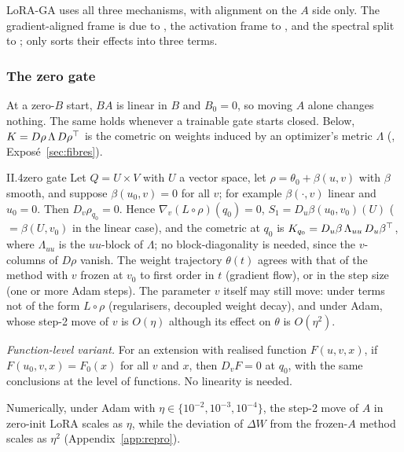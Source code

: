 \medskip
LoRA-GA uses all three mechanisms, with alignment on the $A$ side only. The gradient-aligned frame is due to
\citet{wang2024lorab}, the activation frame to \citet{paischer2024parameter}, and the spectral split to
\citet{meng2024pissa};  only sorts their effects into three terms.

\subsubsection{The zero gate}\label{sec:strata-gate}

At a zero-$B$ start, $BA$ is linear in $B$ and $B_0=0$, so moving $A$ alone changes nothing. The same holds whenever a
trainable gate starts closed. Below, $K=D\rho\,\Lambda\,D\rho^{\top}$ is the cometric on weights induced by an optimizer's
metric $\Lambda$ (, Exposé~\ref{sec:fibres}).

\begin{lemma}{II.4}{zero gate}
Let $Q=U\times V$ with $U$ a vector space, let $\rho=\theta_0+\beta(u,v)$ with $\beta$ smooth, and suppose
$\beta(u_0,v)=0$ for all $v$; for example $\beta(\cdot,v)$ linear and $u_0=0$. Then $D_v\rho_{q_0}=0$. Hence
$\nabla_v(L\circ\rho)(q_0)=0$, $S_1=D_u\beta(u_0,v_0)(U)$ ($=\beta(U,v_0)$ in the linear case), and the cometric at
$q_0$ is $K_{q_0}=D_u\beta\,\Lambda_{uu}\,D_u\beta^{\top}$, where $\Lambda_{uu}$ is the $uu$-block of $\Lambda$; no
block-diagonality is needed, since the $v$-columns of $D\rho$ vanish. The weight trajectory $\theta(t)$ agrees with that
of the method with $v$ frozen at $v_0$ to first order in $t$ (gradient flow), or in the step size (one or more Adam
steps). The parameter $v$ itself may still move: under terms not of the form $L\circ\rho$ (regularisers, decoupled
weight decay), and under Adam, whose step-2 move of $v$ is $O(\eta)$ although its effect on $\theta$ is $O(\eta^2)$.

\emph{Function-level variant.} For an extension with realised function $F(u,v,x)$, if $F(u_0,v,x)=F_0(x)$ for all $v$
and $x$, then $D_vF=0$ at $q_0$, with the same conclusions at the level of functions. No linearity is needed.
\end{lemma}

Numerically, under Adam with $\eta\in\{10^{-2},10^{-3},10^{-4}\}$, the step-2 move of $A$ in zero-init LoRA scales as
$\eta$, while the deviation of $\Delta W$ from the frozen-$A$ method scales as $\eta^2$ (Appendix~\ref{app:repro}).

